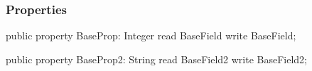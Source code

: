 \documentclass{report}
\newif\ifpdf
\begin{document}
\subsubsection*{\large{\textbf{Properties}}\normalsize\hspace{1ex}\hfill}
\begin{list}{}{
\setlength{\itemindent}{0cm}
\setlength{\listparindent}{0cm}
\setlength{\leftmargin}{\evensidemargin}
\addtolength{\leftmargin}{\tmplength}
\settowidth{\labelsep}{X}
\addtolength{\leftmargin}{\labelsep}
\setlength{\labelwidth}{\tmplength}
}
\label{ok_inherited_members.TBase-BaseProp}
\item[\textbf{BaseProp}\hfill]
\ifpdf
\begin{flushleft}
\fi
\begin{ttfamily}
public property BaseProp: Integer read BaseField write BaseField;\end{ttfamily}

\ifpdf
\end{flushleft}
\fi


\par  \label{ok_inherited_members.TBase-BaseProp2}
\item[\textbf{BaseProp2}\hfill]
\ifpdf
\begin{flushleft}
\fi
\begin{ttfamily}
public property BaseProp2: String read BaseField2 write BaseField2;\end{ttfamily}

\ifpdf
\end{flushleft}
\fi


\par  \end{list}
\end{document}
